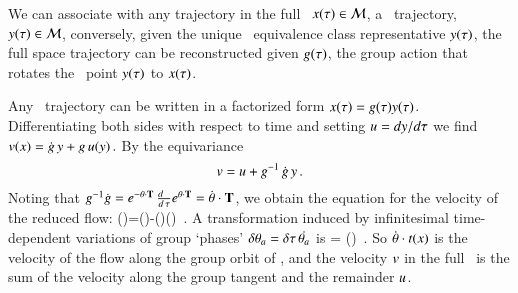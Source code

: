 


We can associate with any trajectory in the full \statesp\,
$x(\tau) \in {\cal M}$, a \reducedsp\ trajectory, $y(\tau) \in {\cal M}$,
conversely, given the unique \reducedsp\ equivalence class
representative  $y(\tau)$,
the full space trajectory can be reconstructed given $g(\tau)$, the
group action that rotates the \reducedsp\ point
$y(\tau)$  to $x(\tau)$.

Any \statesp\ trajectory can be written in a factorized
form $x(\tau)=g(\tau)
y(\tau)$. Differentiating both sides with respect to time and
setting $u={dy}/{d\tau}$ we find
\(
v(x)=\dot{g} \, y+g \, u(y)
\,.
\)
By the equivariance 
\[
v=u + g^{-1} \, \dot{g} \, y
\,.
\]
Noting that $g^{-1}\dot{g}=e^{-{\bf \theta} \cdot \mathbf{T}} \,
\frac{d ~~}{d \, \tau} e^{{\bf \theta} \cdot \mathbf{T}}=\dot{{\bf \theta}}\cdot \mathbf{T}$,
we obtain the equation for the velocity of the reduced flow:
\beq
\velRed(\sspRed)=\vel(\sspRed)-\dot{\gSpace}(\sspRed)\cdot \groupTan(\sspRed)
\,.
A transformation induced by infinitesimal
time-dependent variations  of group `phases'
$\delta {\bf \theta}_a = {\delta \tau} \, \dot{{\bf \theta}_a}$ is
\beq
\dot{\ssp} = \dot{\gSpace} \cdot \groupTan(\ssp)
\,.
So $\dot{{\bf \theta}} \cdot t(x)$ is the velocity
of the flow along the group orbit of \ssp, and
the velocity $v$ in the full \statesp\ is the sum of
the velocity along the group tangent and the remainder $u$.

